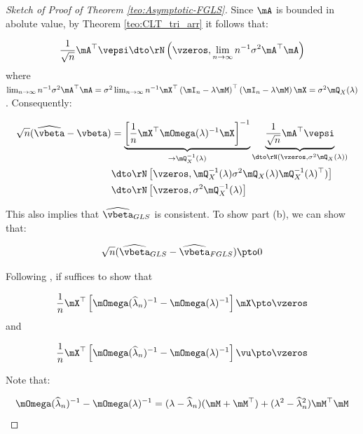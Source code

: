 \documentclass[english,12pt]{book}\usepackage[]{graphicx}\usepackage[]{xcolor}
\begin{document}
\begin{proof}[Sketch of Proof of Theorem \ref{teo:Asymptotic-FGLS}]
Since $\mA$ is bounded in abolute value, by Theorem \ref{teo:CLT_tri_arr} it follows that:

\begin{equation}
\frac{1}{\sqrt{n}}\mA^\top\vepsi  \dto \rN\left(\vzeros, \lim_{n\to\infty}n^{-1}\sigma^2\mA^\top\mA\right)
\end{equation}
%
where  $\lim_{n\to\infty}n^{-1}\sigma^2\mA^\top\mA = \sigma^2\lim_{n\to\infty}n^{-1}\mX^\top\left(\mI_n - \lambda\mM\right)^\top\left(\mI_n - \lambda\mM\right)\mX=\sigma^2\mQ_X(\lambda)$. Consequently:


\begin{equation*}
  \begin{aligned}
  \sqrt{n}(\widehat{\vbeta} - \vbeta) & =  \underbrace{\left[\frac{1}{n}\mX^\top\mOmega(\lambda)^{-1}\mX\right]^{-1}}_{\to \mQ_X^{-1}(\lambda)}\underbrace{\frac{1}{\sqrt{n}}\mA^\top\vepsi}_{\dto \rN(\vzeros, \sigma^2\mQ_X(\lambda))} \\
   & \dto \rN\left[\vzeros, \mQ_X^{-1}(\lambda)\sigma^2\mQ_X(\lambda)\mQ_X^{-1}(\lambda)^\top)\right] \\
   & \dto \rN\left[\vzeros, \sigma^2\mQ_X^{-1}(\lambda)\right]
  \end{aligned}
\end{equation*}

This also implies that $\widehat{\vbeta}_{GLS}$ is consistent. To show part (b), we can show that:

\begin{equation*}
  \sqrt{n}(\widehat{\vbeta}_{GLS} - \widehat{\vbeta}_{FGLS}) \pto 0
\end{equation*}


Following \cite{kelejian1999generalized}, if suffices to show that 

\begin{equation}\label{eq:omega-omega}
\frac{1}{n}\mX^\top\left[\mOmega(\widehat{\lambda}_n)^{-1}- \mOmega(\lambda)^{-1}\right]\mX\pto \vzeros
\end{equation}
%
and

\begin{equation*}
\frac{1}{n}\mX^\top\left[\mOmega(\widehat{\lambda}_n)^{-1}- \mOmega(\lambda)^{-1}\right]\vu\pto \vzeros
\end{equation*}

Note that:

\begin{equation*}
  \mOmega(\widehat{\lambda}_n)^{-1}- \mOmega(\lambda)^{-1} = (\lambda - \widehat{\lambda}_n)(\mM + \mM^\top) + (\lambda^2 - \widehat{\lambda}_n^2)\mM^\top\mM
\end{equation*}


\end{proof}
\end{document}
